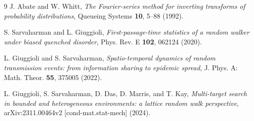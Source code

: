 \documentclass[11pt,fontset=fandol]{ctexart}
\begin{document}
\begin{thebibliography}{9}
J. Abate and W. Whitt,
\emph{The Fourier-series method for inverting transforms of probability distributions},
Queueing Systems \textbf{10}, 5--88 (1992).

S. Sarvaharman and L. Giuggioli,
\emph{First-passage-time statistics of a random walker under biased quenched disorder},
Phys. Rev. E \textbf{102}, 062124 (2020).

L. Giuggioli and S. Sarvaharman,
\emph{Spatio-temporal dynamics of random transmission events: from information sharing to epidemic spread},
J. Phys. A: Math. Theor. \textbf{55}, 375005 (2022).

L. Giuggioli, S. Sarvaharman, D. Das, D. Marris, and T. Kay,
\emph{Multi-target search in bounded and heterogeneous environments: a lattice random walk perspective},
arXiv:2311.00464v2 [cond-mat.stat-mech] (2024).
\end{thebibliography}
\end{document}
